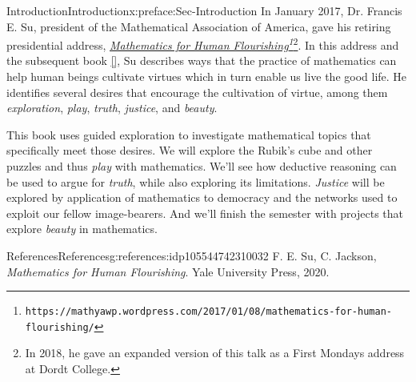 \documentclass[oneside,10pt,]{book}
\newcommand{\xreffont}{\relax}
\numberwithin{equation}{section}
\begin{document}
\null\clearpage
%
%
\typeout{************************************************}
\typeout{************************************************}
%
\begin{preface}{Introduction}{}{Introduction}{}{}{x:preface:Sec-Introduction}
In January 2017, Dr. Francis E. Su, president of the Mathematical Association of America, gave his retiring presidential address, \emph{\href{https://mathyawp.wordpress.com/2017/01/08/mathematics-for-human-flourishing/}{Mathematics for Human Flourishing}\footnote{\nolinkurl{https://mathyawp.wordpress.com/2017/01/08/mathematics-for-human-flourishing/}\label{g:fn:idp105544742305296}}}\footnote{In 2018, he gave an expanded version of this talk as a First Mondays address at Dordt College.\label{g:fn:idp105544742305552}}. In this address and the subsequent book \hyperlink{x:biblio:Su2020}{[{\xreffont 1}]}, Su describes ways that the practice of mathematics can help human beings cultivate virtues which in turn enable us live the good life. He identifies several desires that encourage the cultivation of virtue, among them \emph{exploration}, \emph{play}, \emph{truth}, \emph{justice}, and \emph{beauty}.%
\par
This book uses guided exploration to investigate mathematical topics that specifically meet those desires. We will explore the Rubik's cube and other puzzles and thus \emph{play} with mathematics. We'll see how deductive reasoning can be used to argue for \emph{truth}, while also exploring its limitations. \emph{Justice} will be explored by application of mathematics to democracy and the networks used to exploit our fellow image-bearers. And we'll finish the semester with projects that explore \emph{beauty} in mathematics.%
%
%
\typeout{************************************************}
\typeout{************************************************}
%
\begin{references-}{References}{}{References}{}{}{g:references:idp105544742310032}
F. E. Su, C. Jackson, \emph{Mathematics for Human Flourishing}. Yale University Press, 2020.\end{references-}
\end{preface}
%
%
\typeout{************************************************}
\typeout{************************************************}
%
\end{document}
